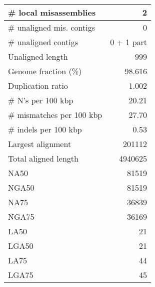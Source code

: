 \documentclass[12pt,a4paper]{article}
\begin{document}
\begin{table}[ht]
\begin{center}
\begin{tabular}{|l*{1}{|r}|}
\# local misassemblies & 2 \\ \hline
\# unaligned mis. contigs & 0 \\ \hline
\# unaligned contigs & 0 + 1 part \\ \hline
Unaligned length & 999 \\ \hline
Genome fraction (\%) & 98.616 \\ \hline
Duplication ratio & 1.002 \\ \hline
\# N's per 100 kbp & 20.21 \\ \hline
\# mismatches per 100 kbp & 27.70 \\ \hline
\# indels per 100 kbp & 0.53 \\ \hline
Largest alignment & 201112 \\ \hline
Total aligned length & 4940625 \\ \hline
NA50 & 81519 \\ \hline
NGA50 & 81519 \\ \hline
NA75 & 36839 \\ \hline
NGA75 & 36169 \\ \hline
LA50 & 21 \\ \hline
LGA50 & 21 \\ \hline
LA75 & 44 \\ \hline
LGA75 & 45 \\ \hline
\end{tabular}
\end{center}
\end{table}
\end{document}
